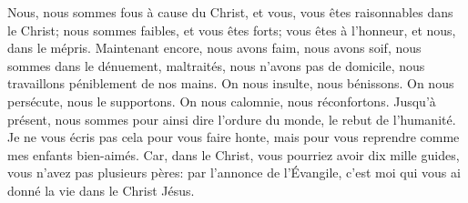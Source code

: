 Nous, nous sommes fous à cause du Christ,
	et vous, vous êtes raisonnables dans le Christ;
	nous sommes faibles, et vous êtes forts;
	vous êtes à l’honneur, et nous, dans le mépris.
Maintenant encore, nous avons faim, nous avons soif, nous sommes dans le dénuement,
	maltraités, nous n’avons pas de domicile, nous travaillons péniblement de nos mains.
On nous insulte, nous bénissons.
	On nous persécute, nous le supportons.
	On nous calomnie, nous réconfortons.
Jusqu’à présent, nous sommes pour ainsi dire l’ordure du monde, le rebut de l’humanité.
Je ne vous écris pas cela pour vous faire honte,
	mais pour vous reprendre comme mes enfants bien-aimés.
Car, dans le Christ, vous pourriez avoir dix mille guides,
	vous n’avez pas plusieurs pères:
	par l’annonce de l’Évangile, c’est moi qui vous ai donné la vie dans le Christ Jésus.
